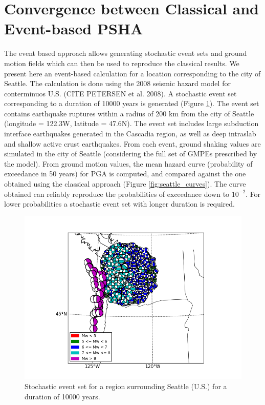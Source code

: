 \section{Convergence between Classical and Event-based PSHA}
The event based approach allows generating stochastic event sets and ground motion fields which can then
be used to reproduce the classical results. We present here an event-based calculation for a location corresponding to the city of Seattle. The calculation is done using the 2008 seismic hazard model for conterminuos U.S. (CITE PETERSEN et al. 2008). A stochastic event set corresponding to a duration of 10000
years is generated (Figure \ref{fig:seattle_ses}). The event set contains earthquake ruptures within a radius of
200 km from the city of Seattle (longitude = 122.3W, latitude = 47.6N). The event set includes large subduction interface earthquakes generated in the Cascadia region, as well as deep intraslab and shallow active crust earthquakes. From each event, ground shaking values are simulated in the city of Seattle (considering the full set of GMPEs prescribed by the model). From ground motion values, the mean
hazard curve (probability of exceedance in 50 years) for PGA is computed, and compared against the
one obtained using the classical approach (Figure \ref{fig:seattle_curves}). The curve obtained can reliably
reproduce the probabilities of exceedance down to $10^{-2}$. For lower probabilities a stochastic event
set with longer duration is required.
\begin{figure}
\centering
\includegraphics[width=14cm]{./Pictures/ses_USA_NSHMP2008.png}
\caption{Stochastic event set for a region surrounding Seattle (U.S.) for a duration of 10000 years.}
\label{fig:seattle_ses}
\end{figure}

